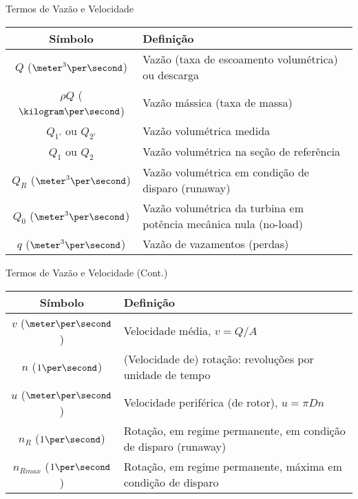     \begin{frame}{Termos de Vazão e Velocidade}\vspace*{-1em}
        \setlength{\tabcolsep}{2mm}
        \noindent\begin{longtable}{cp{110mm}}
            \alert{Símbolo} & \alert{Definição} \\
            \hline
            $Q$ ($\meter^3\per\second$) &
            Vazão (taxa de escoamento volumétrica) ou descarga \\
            $\rho Q$ ($\kilogram\per\second$) &
            Vazão mássica (taxa de massa) \\
            $Q_{1'}$ ou $Q_{2'}$ &
            Vazão volumétrica medida \\
            $Q_{1}$ ou $Q_{2}$ &
            Vazão volumétrica na seção de referência \\
            $Q_{R}$ ($\meter^3\per\second$) &
            Vazão volumétrica em condição de disparo (runaway) \\
            $Q_{0}$ ($\meter^3\per\second$) &
            Vazão volumétrica da turbina em potência mecânica nula (no-load) \\
            $q$ ($\meter^3\per\second$) &
            Vazão de vazamentos (perdas) \\
            \hline
        \end{longtable}
    \end{frame}

    \begin{frame}{Termos de Vazão e Velocidade (Cont.)}\vspace*{-1em}
        \setlength{\tabcolsep}{2mm}
        \noindent\begin{longtable}{cp{110mm}}
            \alert{Símbolo} & \alert{Definição} \\
            \hline
            $v$ ($\meter\per\second$) &
            Velocidade média, \alert{$v = Q/A$} \\
            $n$ ($1\per\second$) &
            (Velocidade de) rotação: revoluções por unidade de tempo \\
            $u$ ($\meter\per\second$) &
            Velocidade periférica (de rotor), \alert{$u = \pi Dn$} \\
            $n_{R}$ ($1\per\second$) &
            Rotação, em regime permanente, em condição de disparo (runaway) \\
            $n_{Rmax}$ ($1\per\second$) &
            Rotação, em regime permanente, máxima em condição de disparo \\
            \hline
        \end{longtable}
    \end{frame}

